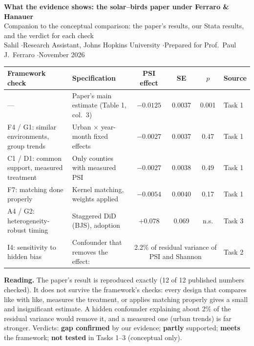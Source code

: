 \documentclass[10pt]{article}
\begin{document}
\begin{center}
{\LARGE\bfseries What the evidence shows: the solar--birds paper under Ferraro \& Hanauer}\\[5pt]
{\large Companion to the conceptual comparison: the paper's results, our Stata results, and the verdict for each check}\\[7pt]
Sahil \quad$\cdot$\quad Research Assistant, Johns Hopkins University \quad$\cdot$\quad Prepared for Prof.\ Paul J.\ Ferraro \quad$\cdot$\quad November 2026
\end{center}

\begin{tcolorbox}[colback=boxgray,colframe=jhublue,boxrule=0.6pt,arc=2pt,left=6pt,right=6pt,top=4pt,bottom=4pt,title=\textbf{Headline: how the main estimate changes as each framework check is applied}]
\small
\begin{tabular}{@{}l l c c c l@{}}
\toprule
Framework check & Specification & PSI effect & SE & $p$ & Source\\
\midrule
--- & Paper's main estimate (Table 1, col.\ 3) & $-0.0125$ & 0.0037 & 0.001 & Task 1\\
F4 / G1: similar environments, group trends & Urban $\times$ year-month fixed effects & $-0.0027$ & 0.0037 & 0.47 & Task 1\\
C1 / D1: common support, measured treatment & Only counties with measured PSI & $-0.0027$ & 0.0038 & 0.49 & Task 1\\
F7: matching done properly & Kernel matching, weights applied & $-0.0054$ & 0.0040 & 0.17 & Task 1\\
A4 / G2: heterogeneity-robust timing & Staggered DiD (BJS), adoption & $+0.078$ & 0.069 & n.s. & Task 3\\
I4: sensitivity to hidden bias & Confounder that removes the effect: & \multicolumn{3}{c}{2.2\% of residual variance of PSI and Shannon} & Task 2\\
\bottomrule
\end{tabular}

\smallskip
\textbf{Reading.} The paper's result is reproduced exactly (12 of 12 published numbers checked). It does not survive the framework's checks: every design that compares like with like, measures the treatment, or applies matching properly gives a small and insignificant estimate. A hidden confounder explaining about 2\% of the residual variance would remove it, and a measured one (urban trends) is far stronger. Verdicts: \textcolor{gapred}{\textbf{gap confirmed}} by our evidence; \textcolor{partamber}{\textbf{partly}} supported; \textcolor{okgreen}{\textbf{meets}} the framework; \textcolor{ntgray}{\textbf{not tested}} in Tasks 1--3 (conceptual only).
\end{tcolorbox}
\end{document}
